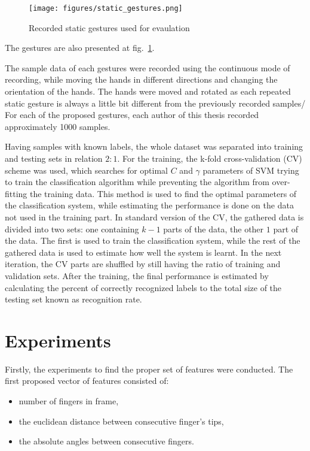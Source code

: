 \begin{figure}[htb]
\centering
 \texttt{[image: figures/static\_gestures.png]}
 \caption{Recorded static gestures used for evaulation}
 \label{staticgesturesdata}
\end{figure}
The gestures are also presented at fig.~\ref{staticgesturesdata}.

The sample data of each gestures were recorded using the continuous mode of recording, while moving the hands in different directions and changing the orientation of the hands.
The hands were moved and rotated as each repeated static gesture is always a little bit different from the previously recorded samples/ 
For each of the proposed gestures, each author of this thesis recorded approximately 1000 samples.

Having samples with known labels, the whole dataset was separated into training and testing sets in relation $2:1$. 
For the training, the k-fold cross-validation (CV) scheme was used, which searches for optimal $C$ and $\gamma$ parameters of SVM trying to train the classification algorithm while preventing the algorithm from over-fitting the training data.
This method is used to find the optimal parameters of the classification system, while estimating the performance is done on the data not used in the training part. 
In standard version of the CV, the gathered data is divided into two sets: one containing $k-1$ parts of the data, the other $1$ part of the data. 
The first is used to train the classification system, while the rest of the gathered data is used to estimate how well the system is learnt.
In the next iteration, the CV parts are shuffled by still having the ratio of training and validation sets.
After the training, the final performance is estimated by calculating the percent of correctly recognized labels to the total size of the testing set known as recognition rate.


\section{Experiments}
\label{static:exp}

Firstly, the experiments to find the proper set of features were conducted. The first proposed vector of features consisted of:
\begin{itemize}
\item number of fingers in frame,
\item the euclidean distance between consecutive finger's tips,
\item the absolute angles between consecutive fingers.
\end{itemize} 

